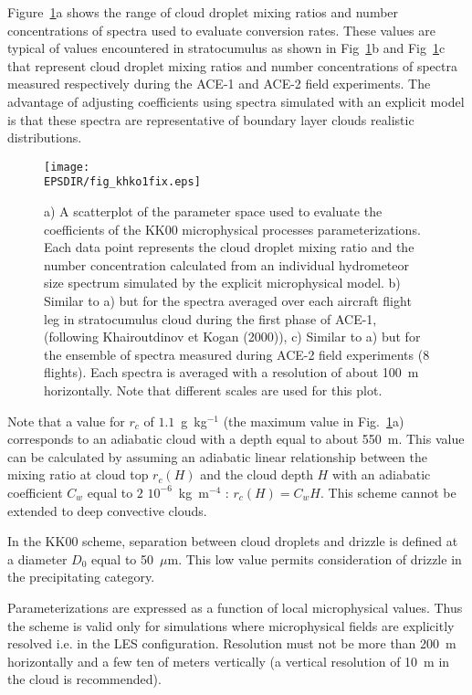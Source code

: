 Figure~\ref{figKHKO}a shows the range of cloud droplet mixing ratios and number concentrations of spectra used to evaluate conversion rates. These values are typical of values encountered in stratocumulus as shown in Fig~\ref{figKHKO}b and Fig~\ref{figKHKO}c that represent cloud droplet mixing ratios and number concentrations of spectra measured respectively during the ACE-1 and 
ACE-2 field experiments. The advantage of adjusting coefficients using spectra simulated with an explicit model is that these spectra are representative of boundary layer clouds realistic distributions.

\begin{figure}[!ht]
\centerline{\texttt{[image: \\EPSDIR/fig\_khko1fix.eps]}}
\caption{ a) A scatterplot of the parameter space used to evaluate the coefficients of the KK00  microphysical processes parameterizations. Each data point represents the cloud droplet mixing ratio and the number concentration calculated from an individual hydrometeor size spectrum simulated by the explicit microphysical model.
b) Similar to a) but for the spectra averaged over each aircraft flight leg in stratocumulus cloud during the first phase of ACE-1,
(following Khairoutdinov et Kogan (2000)),
c) Similar to a) but for the ensemble of spectra measured during ACE-2 field experiments (8 flights). Each spectra is averaged with a resolution of about 100~m horizontally. Note that different scales are used for this plot.}
\label{figKHKO} 
\end{figure}


Note that a value for $r_c$ of $1.1$~g~kg$^{-1}$ (the maximum value in Fig.~\ref{figKHKO}a) corresponds to an adiabatic cloud with a depth equal to about 550~m. This value can be calculated by assuming an adiabatic linear relationship between the mixing ratio at cloud top $r_c(H)$ and the cloud depth $H$ with an adiabatic coefficient $C_w$ equal to $2$ $10^{-6}$~kg~m$^{-4}$ : $r_c(H) = C_w H$. This scheme cannot be extended to deep convective clouds. 

In the KK00 scheme, separation between cloud droplets and drizzle is defined at a diameter $D_0$ equal to 50~$\mu$m. This low value permits consideration of drizzle in the precipitating category.

\noindent Parameterizations are expressed as a function of local microphysical values. Thus the scheme is valid only for simulations where microphysical fields are explicitly resolved i.e. in the LES configuration. Resolution must not be more than 200~m horizontally and a few ten of meters vertically (a vertical resolution of 10~m in the cloud is recommended).   


